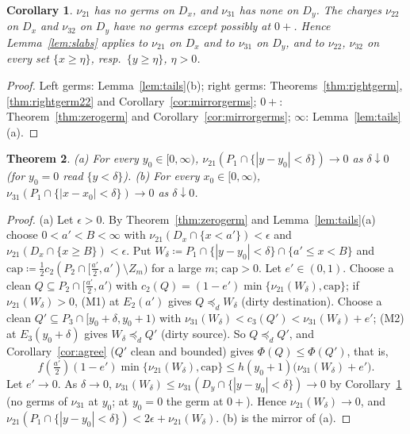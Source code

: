 \documentclass[11pt]{article}
\newtheorem{theorem}{Theorem}
\newtheorem{corollary}[theorem]{Corollary}
\theoremstyle{definition}\newtheorem{definition}[theorem]{Definition}
\theoremstyle{remark}\newtheorem{remark}[theorem]{Remark}
\begin{document}
\begin{corollary}\label{cor:strong}
$\nu_{21}$ has no germs on $D_x$, and $\nu_{31}$ has none on $D_y$. The
charges $\nu_{22}$ on $D_x$ and $\nu_{32}$ on $D_y$ have no germs except
possibly at $0+$. Hence Lemma~\ref{lem:slabs} applies to $\nu_{21}$ on $D_x$
and to $\nu_{31}$ on $D_y$, and to $\nu_{22}$, $\nu_{32}$ on every set
$\{x\ge\eta\}$, resp.\ $\{y\ge\eta\}$, $\eta>0$.
\end{corollary}
\begin{proof}
Left germs: Lemma~\ref{lem:tails}(b); right germs:
Theorems~\ref{thm:rightgerm}, \ref{thm:rightgerm22} and
Corollary~\ref{cor:mirrorgerms}; $0+$: Theorem~\ref{thm:zerogerm} and
Corollary~\ref{cor:mirrorgerms}; $\infty$: Lemma~\ref{lem:tails}(a).
\end{proof}

\begin{theorem}\label{thm:crossgerm}
(a) For every $y_0\in[0,\infty)$, $\nu_{21}(P_1\cap\{|y-y_0|<\delta\})\to0$
as $\delta\downarrow0$ (for $y_0=0$ read $\{y<\delta\}$). (b) For every
$x_0\in[0,\infty)$, $\nu_{31}(P_1\cap\{|x-x_0|<\delta\})\to0$ as
$\delta\downarrow0$.
\end{theorem}
\begin{proof}
(a) Let $\epsilon>0$. By Theorem~\ref{thm:zerogerm} and
Lemma~\ref{lem:tails}(a) choose $0<a'<B<\infty$ with
$\nu_{21}(D_x\cap\{x<a'\})<\epsilon$ and $\nu_{21}(D_x\cap\{x\ge B\})<
\epsilon$. Put $W_\delta\coloneqq P_1\cap\{|y-y_0|<\delta\}\cap\{a'\le
x<B\}$ and $\mathrm{cap}\coloneqq\frac12c_2(P_2\cap[\frac{a'}2,a')\setminus
Z_m)$ for a large $m$; $\mathrm{cap}>0$. Let $e'\in(0,1)$. Choose a clean
$Q\subseteq P_2\cap[\frac{a'}2,a')$ with $c_2(Q)=(1-e')\min\{\nu_{21}(
W_\delta),\mathrm{cap}\}$; if $\nu_{21}(W_\delta)>0$, (M1) at $E_2(a')$ gives
$Q\preceq_dW_\delta$ (dirty destination). Choose a clean $Q'\subseteq
P_3\cap[y_0+\delta,y_0+1)$ with $\nu_{31}(W_\delta)<c_3(Q')<\nu_{31}(
W_\delta)+e'$; (M2) at $E_3(y_0+\delta)$ gives $W_\delta\preceq_dQ'$ (dirty
source). So $Q\preceq_dQ'$, and Corollary~\ref{cor:agree} ($Q'$ clean and
bounded) gives $\Phi(Q)\le\Phi(Q')$, that is,
\[
 f(\tfrac{a'}2)(1-e')\min\{\nu_{21}(W_\delta),\mathrm{cap}\}\le
 h(y_0+1)\bigl(\nu_{31}(W_\delta)+e'\bigr).
\]
Let $e'\to0$. As $\delta\to0$, $\nu_{31}(W_\delta)\le\nu_{31}(D_y\cap
\{|y-y_0|<\delta\})\to0$ by Corollary~\ref{cor:strong} (no germs of
$\nu_{31}$ at $y_0$; at $y_0=0$ the germ at $0+$). Hence
$\nu_{21}(W_\delta)\to0$, and $\nu_{21}(P_1\cap\{|y-y_0|<\delta\})<
2\epsilon+\nu_{21}(W_\delta)$. (b) is the mirror of (a).
\end{proof}
\end{document}
